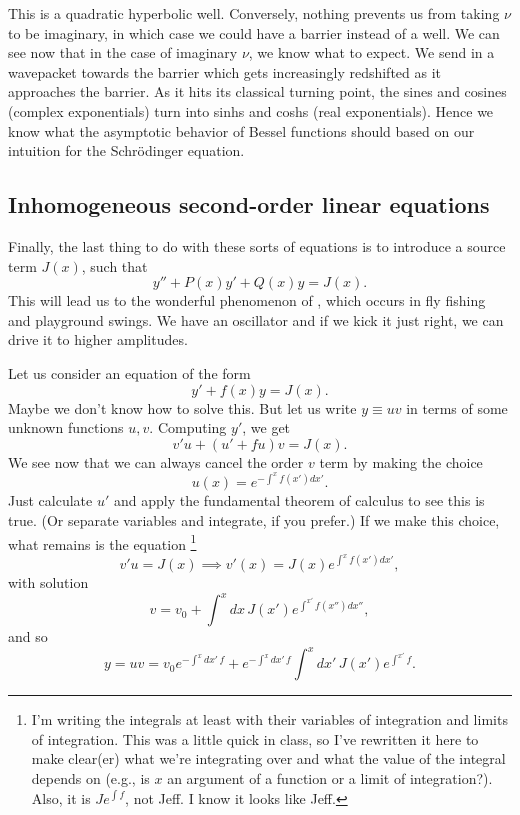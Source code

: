 This is a quadratic hyperbolic well. Conversely, nothing prevents us from taking $\nu$ to be imaginary, in which case we could have a barrier instead of a well.
We can see now that in the case of imaginary $\nu$, we know what to expect. We send in a wavepacket towards the barrier which gets increasingly redshifted as it approaches the barrier. As it hits its classical turning point, the sines and cosines (complex exponentials) turn into sinhs and coshs (real exponentials). Hence we know what the asymptotic behavior of Bessel functions should based on our intuition for the Schr\"odinger equation.

\subsection*{Inhomogeneous second-order linear equations}
Finally, the last thing to do with these sorts of equations is to introduce a source term $J(x)$, such that
\begin{equation}
    y'' + P(x) y' + Q(x)y = J(x).
\end{equation}
This will lead us to the wonderful phenomenon of , which occurs in fly fishing and playground swings. We have an oscillator and if we kick it just right, we can drive it to higher amplitudes.

Let us consider an equation of the form
\begin{equation}
    y'+f(x) y = J(x).
\end{equation}
Maybe we don't know how to solve this. But let us write $y\equiv uv$ in terms of some unknown functions $u,v$. Computing $y'$, we get
\begin{equation}
    v' u + (u'  +f u)v = J(x).
\end{equation}
We see now that we can always cancel the order $v$ term by making the choice
\begin{equation}
    u(x)=e^{-\int^x f(x')dx'}.
\end{equation}
Just calculate $u'$ and apply the fundamental theorem of calculus to see this is true. (Or separate variables and integrate, if you prefer.) If we make this choice, what remains is the equation%
    \footnote{I'm writing the integrals at least with their variables of integration and limits of integration. This was a little quick in class, so I've rewritten it here to make clear(er) what we're integrating over and what the value of the integral depends on (e.g., is $x$ an argument of a function or a limit of integration?). Also, it is $J e^{\int f}$, not Jeff. I know it looks like Jeff.}
\begin{equation}
    v' u = J(x) \implies v'(x) = J(x) e^{\int^x f(x') dx'},
\end{equation}
with solution
\begin{equation}
    v= v_0 + \int^x dx \, J(x') e^{\int^{x'} f(x'')dx''},
\end{equation}
and so
\begin{equation}
    y= uv= v_0 e^{-\int^x dx'\,f} + e^{-\int^x dx'\,f} \int^x dx'\,J(x') e^{\int^{x'} f}.
\end{equation}


